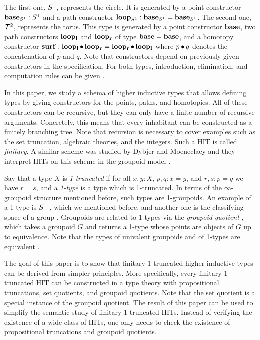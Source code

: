 The first one, $S^1$, represents the circle.
It is generated by a point constructor $\operatorname{\mathbf{base}}_{S^1} : S^1$ and a path constructor $\operatorname{\mathbf{loop}}_{S^1} : \operatorname{\mathbf{base}}_{S^1} = \operatorname{\mathbf{base}}_{S^1}$.
The second one, $\mathcal{T}^2$, represents the torus.
This type is generated by a point constructor $\operatorname{\mathbf{base}}$, two path constructors $\operatorname{\mathbf{loop_l}}$ and $\operatorname{\mathbf{loop_r}}$ of type $\operatorname{\mathbf{base}} = \operatorname{\mathbf{base}}$,
and a homotopy constructor $\operatorname{\mathbf{surf}} : \operatorname{\mathbf{loop_l}} \bullet \operatorname{\mathbf{loop_r}} = \operatorname{\mathbf{loop_r}} \bullet \operatorname{\mathbf{loop_l}}$
where $p \bullet q$ denotes the concatenation of $p$ and $q$.
Note that constructors depend on previously given constructors in the specification.
For both types, introduction, elimination, and computation rules can be given \cite{hottbook}.

In this paper, we study a schema of higher inductive types that allows defining types by
giving constructors for the points, paths, and homotopies.
All of these constructors can be recursive, but they can only have a finite number of recursive arguments.
Concretely, this means that every inhabitant can be constructed as a finitely branching tree.
Note that recursion is necessary to cover examples such as the set truncation, algebraic theories, and the integers.
Such a HIT is called \emph{finitary}.
A similar scheme was studied by Dybjer and Moeneclaey
and they interpret HITs on this scheme in the groupoid model \cite{DBLP:journals/entcs/DybjerM18}.

Say that a type $X$ is \emph{1-truncated} if for all $x, y : X$, $p, q : x = y$, and $r, s : p = q$ we have $r = s$,
and a \emph{1-type} is a type which is 1-truncated.
In terms of the $\infty$-groupoid structure mentioned before, such types are 1-groupoids.
An example of a 1-type is $S^1$ \cite{LicataS13}, which we mentioned before,
and another one is the classifying space of a group \cite{LicataF14}.
Groupoids are related to 1-types via the \emph{groupoid quotient} \cite{sojakovaPhD},
which takes a groupoid $G$ and returns a 1-type
whose points are objects of $G$ up to equivalence.
Note that the types of univalent groupoids and of 1-types are equivalent \cite{rezk_completion}.

The goal of this paper is to show that finitary 1-truncated higher inductive types can be derived from simpler principles.
More specifically, every finitary 1-truncated HIT can be constructed in a type theory
with propositional truncations, set quotients, and groupoid quotients.
Note that the set quotient is a special instance of the groupoid quotient.
The result of this paper can be used to simplify the semantic study of finitary 1-truncated HITs.
Instead of verifying the existence of a wide class of HITs, one only needs to check the existence
of propositional truncations and groupoid quotients.


